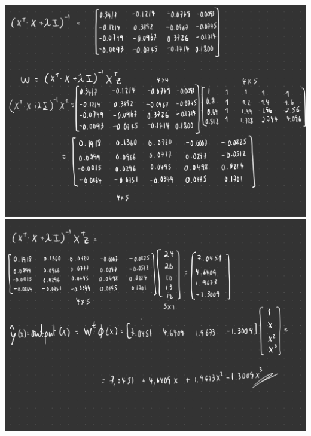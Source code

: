 \documentclass[12pt]{article}
\begin{document}
\begin{enumerate}[leftmargin=\labelsep]
\begin{center}
\includegraphics[scale=0.2]{images/Project-33.jpg}
\newline
\includegraphics[scale=0.2]{images/Project-34.jpg}
\newline
\end{center}
\newpage


\end{enumerate}
\end{document}
